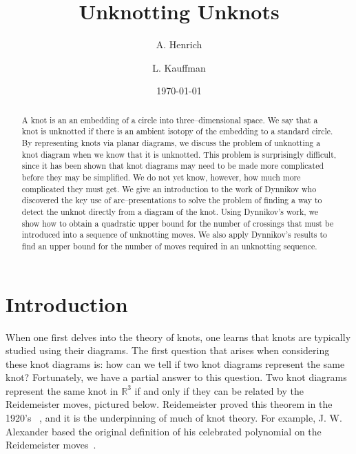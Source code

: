 \documentclass{amsart}
\begin{document}
\title[]{Unknotting Unknots}
\author{A. Henrich}
\address{Seattle University\\
Seattle, WA 98122}
\author{L. Kauffman}
\address{University of Illinois, Chicago\\
Chicago, IL 60607}



\date{\today}

\begin{abstract} A knot is an an embedding of a circle into three--dimensional space. We say that a knot is unknotted if there is an ambient isotopy of the embedding to a standard circle. By representing knots via planar diagrams, we discuss the problem of unknotting a knot diagram when we know that it is unknotted. This problem is surprisingly difficult, since it has been shown that knot diagrams may need to be made more complicated before they may be simplified. We do not yet know, however, how much more complicated they must get. We give an introduction to the work of Dynnikov who discovered the key use of arc--presentations to solve the problem of finding a way to detect the unknot directly from a diagram of the knot. Using Dynnikov's work, we show how to obtain a quadratic upper bound for the number of crossings that must be introduced into a sequence of unknotting moves. We also apply Dynnikov's results to find an upper bound for the number of moves required in an unknotting sequence.
\end{abstract}
\maketitle

\section{Introduction}
When one first delves into the theory of knots, one learns that knots are typically studied using their diagrams. The first question that arises when considering these knot diagrams is: how can we tell if two knot diagrams represent the same knot? Fortunately, we have a partial answer to this question. Two knot diagrams represent the same knot in $\mathbb{R}^3$ if and only if they can be related by the Reidemeister moves, pictured below. Reidemeister proved this theorem in the 1920's~ \cite{Reid}, and 
it is the underpinning of much of knot theory. For example, J. W. Alexander based the original definition of his celebrated polynomial on the Reidemeister moves~\cite{Alex}. 
\end{document}
